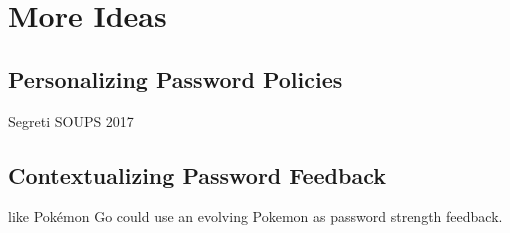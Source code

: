 \chapter[More Ideas]{More Ideas}\label{chap:pst_ideas}

\section{Personalizing Password Policies}

Segreti \etal SOUPS 2017
\cite{Seitz2017PPT}

\section{Contextualizing Password Feedback}
like \cite{Kroeze2012GamifyingAuthentication} Pokémon Go could use an evolving Pokemon as password strength feedback. 